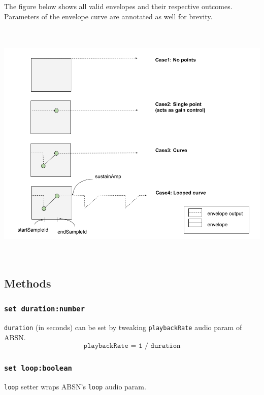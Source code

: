 \documentclass[20pt]{article}
\begin{document}
The figure below shows all valid envelopes and their respective outcomes. Parameters of the envelope curve are annotated as well for brevity.

\includegraphics[width=15cm,height=12cm]{cases.png} 

\subsection*{Methods}
\subsubsection*{\texttt{set duration:number}}
\texttt{duration} (in seconds) can be set by tweaking \texttt{playbackRate} audio param of ABSN.
\begin{equation}
\texttt{playbackRate = 1 / duration}
\end{equation}

\subsubsection*{\texttt{set loop:boolean}}
\texttt{loop} setter wraps ABSN's \texttt{loop} audio param.
\end{document}
